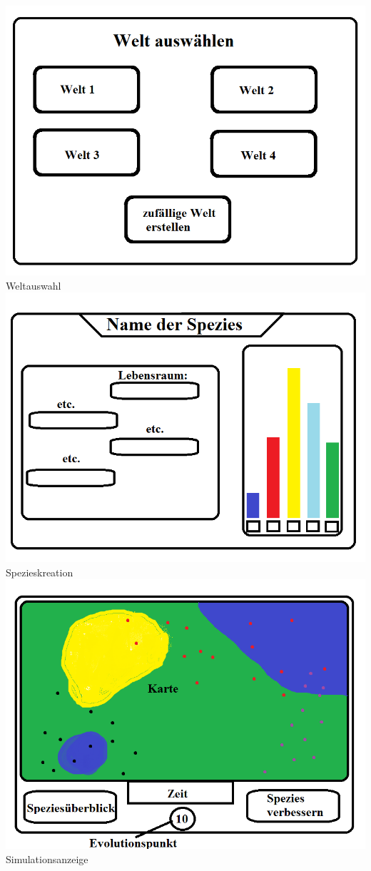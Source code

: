 \documentclass[a4paper, 10pt]{article}
\begin{document}
\begin{minipage}{49mm} 
\includegraphics[scale=0.45]{Bilder/WeltWahl.png}
Weltauswahl
\includegraphics[scale=0.45]{Bilder/Spezies_Erstellen.png}
Spezieskreation
\includegraphics[scale=0.45]{Bilder/Simulationsbildschirm.png}
Simulationsanzeige
\end{minipage}
\end{document}
